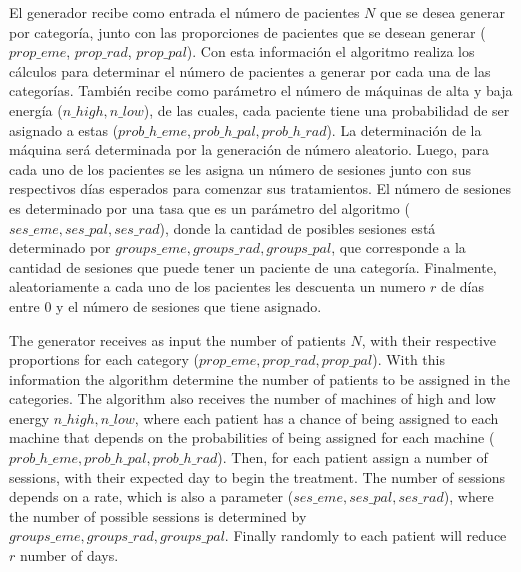 El generador recibe como entrada el n\'umero de pacientes $N$ que se desea generar por categor\'ia, junto con las proporciones de pacientes que se desean generar ($prop\_eme$, $prop\_rad$, $prop\_pal$). Con esta informaci\'on el algoritmo realiza los c\'alculos para determinar el n\'umero de pacientes a generar por cada una de las categor\'ias. Tambi\'en recibe como par\'ametro el n\'umero de m\'aquinas de alta y baja energ\'ia ($n\_high, n\_low$), de las cuales, cada paciente tiene una probabilidad de ser asignado a estas ($prob\_h\_eme, prob\_h\_pal, prob\_h\_rad$). La determinaci\'on de la m\'aquina ser\'a determinada por la generaci\'on de n\'umero aleatorio. Luego, para cada uno de los pacientes se les asigna un n\'umero de sesiones junto con sus respectivos d\'ias esperados para comenzar sus tratamientos. El n\'umero de sesiones es determinado por una tasa que es un par\'ametro del algoritmo ($ses\_eme, ses\_pal, ses\_rad$), donde la cantidad de posibles sesiones est\'a determinado por $groups\_eme, 
groups\_rad, groups\_pal$, que corresponde a la cantidad de sesiones que puede tener un paciente de una categor\'ia. Finalmente, aleatoriamente a cada uno de los pacientes les descuenta un numero $r$ de d\'ias entre $0$ y el n\'umero de sesiones que tiene asignado.

The generator receives as input the number of patients $N$, with their respective proportions for each category ($ prop\_eme, prop\_rad, prop\_pal $). With this information the algorithm determine the number of patients to be assigned in the categories. The algorithm also receives the number of machines of high and low energy $n\_high, n\_low $, where each patient has a chance of being assigned to each machine that depends on the probabilities of being assigned for each machine ($prob\_h\_eme, prob\_h\_pal, prob\_h\_rad$). Then, for each patient assign a number of sessions, with their expected day to begin the treatment. The number of sessions depends on a rate, which is also a parameter ($ses\_eme, ses\_pal, ses\_rad$), where the number of possible sessions is determined by $groups\_eme, groups\_rad, groups\_pal$. Finally randomly to each patient will reduce $r$ number of days.

